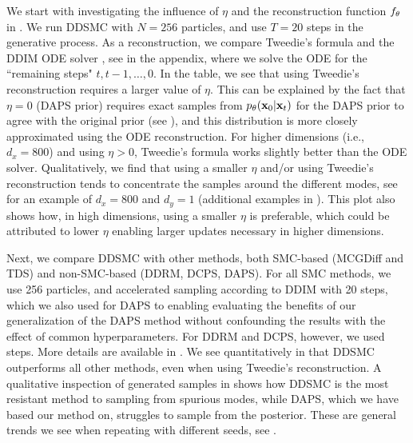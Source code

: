 \documentclass{proc}
\newcommand{\suppmat}{appendix\xspace}
\begin{document}
We start with investigating the influence of $\eta$ and the reconstruction function $f_\theta$ in . 
We run DDSMC with $N=256$ particles, and use $T=20$ steps in the generative process. 
As a reconstruction, we compare Tweedie's formula and the DDIM ODE solver \cite{song_denoising_2021}, see  in the \suppmat, where we solve the ODE for the ``remaining steps" $t, t-1, \dots, 0$. In the table, we see that using Tweedie's reconstruction requires a larger value of $\eta$. This can be explained by the fact that $\eta=0$ (DAPS prior) requires exact samples from $p_\theta(\mathbf{x}_0|\mathbf{x}_{t})$ for the DAPS prior to agree with the original prior (see ), and this distribution is more closely approximated using the ODE reconstruction. For higher dimensions (i.e., $d_x=800$) and using $\eta >0$, Tweedie's formula works slightly better than the ODE solver. Qualitatively, we find that using a smaller $\eta$ and/or using Tweedie's reconstruction tends to concentrate the samples around the different modes, see  for an example of $d_x=800$ and $d_y=1$ (additional examples in ). This plot also shows how, in high dimensions, using a smaller $\eta$ is preferable, which could be attributed to lower $\eta$ enabling larger updates necessary in higher dimensions. 

Next, we compare DDSMC with other methods, both SMC-based (MCGDiff and TDS) and non-SMC-based (DDRM, DCPS, DAPS). For all SMC methods, we use 256 particles, and accelerated sampling according to DDIM \cite{song_denoising_2021} with 20 steps, which we also used for DAPS to enabling evaluating the benefits of our generalization of the DAPS method without confounding the results with the effect of common hyperparameters. For DDRM and DCPS, however, we used  steps. More details are available in . We see quantitatively in  that DDSMC outperforms all other methods, even when using Tweedie's reconstruction. A qualitative inspection of generated samples in  shows how DDSMC is the most resistant method to sampling from spurious modes, while DAPS, which we have based our method on, struggles to sample from the posterior. These are general trends we see when repeating with different seeds, see .
\end{document}
